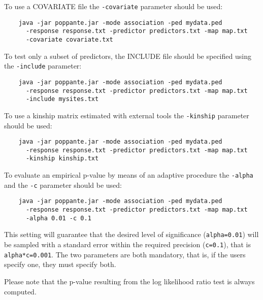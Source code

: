 \documentclass[a4paper,9pt]{article}
\begin{document}
\vspace{0.5cm}

\noindent
To use a COVARIATE file the \texttt{-covariate} parameter should be used:
\begin{Verbatim}
	java -jar poppante.jar -mode association -ped mydata.ped 
	  -response response.txt -predictor predictors.txt -map map.txt
	  -covariate covariate.txt
\end{Verbatim}

\vspace{0.5cm}

\noindent
To test only a subset of predictors, the INCLUDE file should be specified using the \texttt{-include} parameter:
\begin{Verbatim}
	java -jar poppante.jar -mode association -ped mydata.ped 
	  -response response.txt -predictor predictors.txt -map map.txt
	  -include mysites.txt
\end{Verbatim}

\vspace{0.5cm}

\noindent
To use a kinship matrix estimated with external tools the \texttt{-kinship} parameter should be used:
\begin{Verbatim}
	java -jar poppante.jar -mode association -ped mydata.ped 
	  -response response.txt -predictor predictors.txt -map map.txt
	  -kinship kinship.txt
\end{Verbatim}

\vspace{0.5cm}

\noindent
To evaluate an empirical p-value by means of an adaptive procedure the \texttt{-alpha} and the \texttt{-c} parameter should be used:
\begin{Verbatim}
	java -jar poppante.jar -mode association -ped mydata.ped 
	  -response response.txt -predictor predictors.txt -map map.txt
	  -alpha 0.01 -c 0.1
\end{Verbatim}

\noindent
This setting will guarantee that the desired level of significance (\texttt{alpha=0.01}) will be sampled with a standard error within the required precision (\texttt{c=0.1}), that is \texttt{alpha*c=0.001}. The two parameters are both mandatory, that is, if the users specify one, they must specify both.

\noindent
Please note that the p-value resulting from the log likelihood ratio test is always computed.

\vspace{0.5cm}
\end{document}
